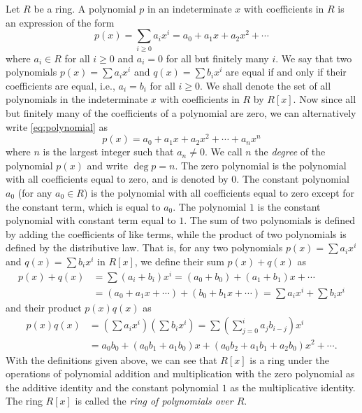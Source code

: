 \begin{example}
    Let \(R\) be a ring. A polynomial \(p\) in an indeterminate \(x\) with
    coefficients in \(R\) is an expression of the form
    \begin{equation}
        \label{eq:polynomial}
        p(x) = \sum_{i \geq 0} a_i x^i = a_0 + a_1 x + a_2 x^2 + \cdots
    \end{equation}
    where \(a_i \in R\) for all \(i \geq 0\) and \(a_i = 0\) for all but
    finitely many \(i\). We say that two polynomials \(p(x) = \sum a_i x^i\) and
    \(q(x) = \sum b_i x^i\) are equal if and only if their coefficients are
    equal, i.e., \(a_i = b_i\) for all \(i \geq 0\). We shall denote the set of
    all polynomials in the indeterminate \(x\) with coefficients in \(R\) by
    \(R[x]\). Now since all but finitely many of the coefficients of a
    polynomial are zero, we can alternatively write \eqref{eq:polynomial} as
    \[
        p(x) = a_0 + a_1 x + a_2 x^2 + \cdots + a_n x^n
    \]
    where \(n\) is the largest integer such that \(a_n \neq 0\). We call \(n\)
    the \emph{degree} of the polynomial \(p(x)\) and write \(\deg p = n\). The
    zero polynomial is the polynomial with all coefficients equal to zero, and
    is denoted by \(0\). The constant polynomial \(a_0\) (for any \(a_0 \in R\))
    is the polynomial with all coefficients equal to zero except for the
    constant term, which is equal to \(a_0\). The polynomial \(1\) is the
    constant polynomial with constant term equal to \(1\). The sum of two
    polynomials is defined by adding the coefficients of like terms, while the
    product of two polynomials is defined by the distributive law. That is, for
    any two polynomials \(p(x) = \sum a_i x^i\) and \(q(x) = \sum b_i x^i\) in
    \(R[x]\), we define their sum \(p(x) + q(x)\) as
    \begin{align*}
        p(x) + q(x) & = \sum (a_i + b_i) x^i = (a_0 + b_0) + (a_1 + b_1)x + \cdots\\
        &= (a_0 + a_1 x + \cdots) + (b_0 + b_1 x + \cdots) = \sum a_i x^i + \sum b_i x^i
    \end{align*}
    and their product \(p(x)q(x)\) as
    \begin{align*}
        p(x)q(x) & = \left(\sum a_i x^i\right)\left(\sum b_i x^i\right) = \sum \left(\sum_{j=0}^{i} a_j b_{i-j}\right) x^i\\
        &= a_0 b_0 + (a_0 b_1 + a_1 b_0)x + (a_0 b_2 + a_1 b_1 + a_2 b_0)x^2 + \cdots.
    \end{align*}
    With the definitions given above, we can see that \(R[x]\) is a ring under
    the operations of polynomial addition and multiplication with the zero
    polynomial as the additive identity and the constant polynomial \(1\) as the
    multiplicative identity. The ring \(R[x]\) is called the \emph{ring of
    polynomials over \(R\)}.


\end{example}
